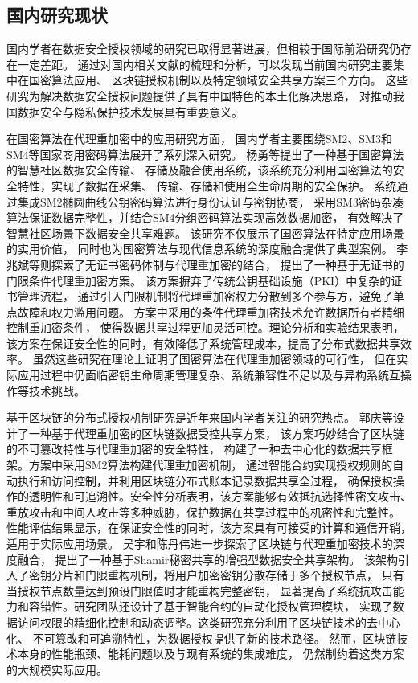 \subsection{国内研究现状}

国内学者在数据安全授权领域的研究已取得显著进展，但相较于国际前沿研究仍存在一定差距。
通过对国内相关文献的梳理和分析，可以发现当前国内研究主要集中在国密算法应用、
区块链授权机制以及特定领域安全共享方案三个方向。
这些研究为解决数据安全授权问题提供了具有中国特色的本土化解决思路，
对推动我国数据安全与隐私保护技术发展具有重要意义。

在国密算法在代理重加密中的应用研究方面，
国内学者主要围绕SM2、SM3和SM4等国家商用密码算法展开了系列深入研究。
杨勇等提出了一种基于国密算法的智慧社区数据安全传输、
存储及融合使用系统，该系统充分利用国密算法的安全特性，实现了数据在采集、
传输、存储和使用全生命周期的安全保护。
系统通过集成SM2椭圆曲线公钥密码算法进行身份认证与密钥协商，
采用SM3密码杂凑算法保证数据完整性，并结合SM4分组密码算法实现高效数据加密，
有效解决了智慧社区场景下数据安全共享难题。
该研究不仅展示了国密算法在特定应用场景的实用价值，
同时也为国密算法与现代信息系统的深度融合提供了典型案例。
李兆斌等则探索了无证书密码体制与代理重加密的结合，
提出了一种基于无证书的门限条件代理重加密方案。
该方案摒弃了传统公钥基础设施（PKI）中复杂的证书管理流程，
通过引入门限机制将代理重加密权力分散到多个参与方，避免了单点故障和权力滥用问题。
方案中采用的条件代理重加密技术允许数据所有者精细控制重加密条件，
使得数据共享过程更加灵活可控。理论分析和实验结果表明，
该方案在保证安全性的同时，有效降低了系统管理成本，提高了分布式数据共享效率。
虽然这些研究在理论上证明了国密算法在代理重加密领域的可行性，
但在实际应用过程中仍面临密钥生命周期管理复杂、系统兼容性不足以及与异构系统互操作等技术挑战。

基于区块链的分布式授权机制研究是近年来国内学者关注的研究热点。
郭庆等设计了一种基于代理重加密的区块链数据受控共享方案，
该方案巧妙结合了区块链的不可篡改特性与代理重加密的安全特性，
构建了一种去中心化的数据共享框架。方案中采用SM2算法构建代理重加密机制，
通过智能合约实现授权规则的自动执行和访问控制，并利用区块链分布式账本记录数据共享全过程，
确保授权操作的透明性和可追溯性。安全性分析表明，该方案能够有效抵抗选择性密文攻击、
重放攻击和中间人攻击等多种威胁，保护数据在共享过程中的机密性和完整性。
性能评估结果显示，在保证安全性的同时，该方案具有可接受的计算和通信开销，
适用于实际应用场景。
吴宇和陈丹伟进一步探索了区块链与代理重加密技术的深度融合，
提出了一种基于Shamir秘密共享的增强型数据安全共享架构。
该架构引入了密钥分片和门限重构机制，将用户加密密钥分散存储于多个授权节点，
只有当授权节点数量达到预设门限值时才能重构完整密钥，
显著提高了系统抗攻击能力和容错性。研究团队还设计了基于智能合约的自动化授权管理模块，
实现了数据访问权限的精细化控制和动态调整。这类研究充分利用了区块链技术的去中心化、
不可篡改和可追溯特性，为数据授权提供了新的技术路径。
然而，区块链技术本身的性能瓶颈、能耗问题以及与现有系统的集成难度，
仍然制约着这类方案的大规模实际应用。

